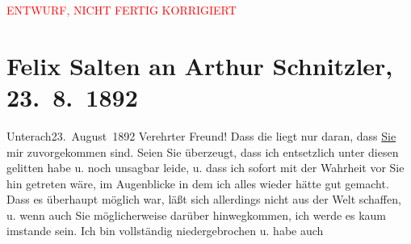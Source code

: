 
\begin{center}
            \textcolor{red}{ENTWURF, NICHT FERTIG KORRIGIERT}
                      \end{center}
            
         
         \renewcommand{\erwaehntePersonen}{Personen: Richard Beer-Hofmann, Hugo von Hofmannsthal, Felix Salten}
         \renewcommand{\erwaehnteOrte}{Orte: Bahnhof, Unterach am Attersee, Wien}
         \renewcommand{\erwaehnteWerke}{}
               \section[Felix Salten an Arthur Schnitzler, 23. 8. 1892]{ Felix Salten an Arthur Schnitzler, 23. 8. 1892}\nopagebreak{}\rehead{ }\begin{ledgroupsized}[t]{13cm}\normalsize\beginnumbering \toendnotes[C]{\smallbreak\pagebreak[2]} 
\toendnotes[C]{\smallbreak}\pstart
           \raggedleft{}{\pb}Unterach23. August 1892\pend
           \pstart
           Verehrter Freund! Dass die \label{K_L03113-1v}\label{K_L03113-1h} liegt nur daran, dass \uline{Sie} mir zuvorgekommen
               sind. Seien Sie überzeugt, dass ich entsetzlich unter diesen \label{K_L03113-2v}\label{K_L03113-2h} gelitten habe u. noch unsagbar leide, u. dass ich sofort mit der Wahrheit vor
               Sie hin getreten wäre, im Augenblicke in dem ich alles wieder hätte gut gemacht. Dass
               es überhaupt möglich war, läßt sich allerdings nicht aus der Welt schaffen, u. wenn
               auch Sie möglicher{\pb}weise darüber hinwegkommen, ich werde
               es kaum imstande sein. Ich bin vollständig niedergebrochen u. habe auch

\end{ledgroupsized}
